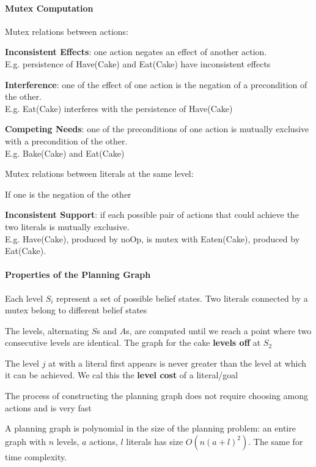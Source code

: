 \documentclass[10pt]{report}
\begin{document}
\paragraph{Mutex Computation} Mutex relations between actions:
\begin{list}{}{}
	\item \textbf{Inconsistent Effects}: one action negates an effect of another action.\\E.g. persistence of Have(Cake) and Eat(Cake) have inconsistent effects
	\item \textbf{Interference}: one of the effect of one action is the negation of a precondition of the other.\\E.g. Eat(Cake) interferes with the persistence of Have(Cake)
	\item \textbf{Competing Needs}: one of the preconditions of one action is mutually exclusive with a precondition of the other.\\E.g. Bake(Cake) and Eat(Cake)
\end{list}
Mutex relations between literals at the same level:
\begin{list}{}{}
	\item If one is the negation of the other
	\item \textbf{Inconsistent Support}: if each possible pair of actions that could achieve the two literals is mutually exclusive.\\
	E.g. Have(Cake), produced by noOp, is mutex with Eaten(Cake), produced by Eat(Cake).
\end{list}
\paragraph{Properties of the Planning Graph}
\begin{list}{}{}
	\item Each level $S_i$ represent a set of possible belief states. Two literals connected by a mutex belong to different belief states
	\item The levels, alternating $S$s and $A$s, are computed until we reach a point where two consecutive levels are identical. The graph for the cake \textbf{levels off} at $S_2$
	\item The level $j$ at with a literal first appears is never greater than the level at which it can be achieved. We cal this the \textbf{level cost} of a literal/goal
	\item The process of constructing the planning graph does not require choosing among actions and is very fast
	\item A planning graph is polynomial in the size of the planning problem: an entire graph with $n$ levels, $a$ actions, $l$ literals has size $O(n(a+l)^2)$. The same for time complexity.
\end{list}
\end{document}
